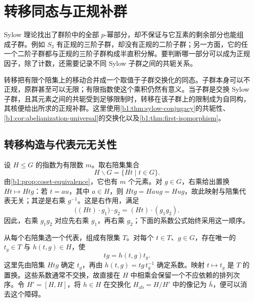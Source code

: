 
\section{转移同态与正规补群}
\label{b1:sec:C05}

Sylow 理论找出了群阶中的全部 \(p\)-幂部分，却不保证与它互素的剩余部分也能组成子群。例如 \(S_3\) 有正规的三阶子群，却没有正规的二阶子群；另一方面，它的任一个二阶子群都与正规的三阶子群构成半直积分解。要判断哪一部分可以成为正规因子，除了计数，还需要记录不同 Sylow 子群之间的共轭关系。

\ProseParagraphBreak
转移把有限个陪集上的移动合并成一个取值于子群交换化的同态。子群本身可以不正规，原群甚至可以无限；有限指数使这个乘积仍然有意义。当子群是交换 Sylow 子群，且其元素之间的共轭受到足够限制时，转移在该子群上的限制成为自同构，其核便给出所求的正规补群。这里使用\cref{b1:thm:sylow-conjugacy}的共轭性、\cref{b1:cor:abelianization-universal}的交换化以及\cref{b1:thm:first-isomorphism}。

\subsection{转移构造与代表元无关性}
\label{b1:subsec:C05:01}

设 \(H\leq G\) 的指数为有限数 \(m\)。取右陪集集合
\[
	H\backslash G=\{Ht\mid t\in G\}.
\]
由\cref{b1:prop:coset-equivalence}，它也有 \(m\) 个元素。对 \(g\in G\)，右乘给出置换 \(Ht\mapsto Htg\)：若 \(t=au\)，其中 \(a\in H\)，则 \(Htg=Haug=Hug\)，故此映射与陪集代表无关；其逆是右乘 \(g^{-1}\)。这是右作用，满足
\[
	\bigl((Ht)\cdot g_1\bigr)\cdot g_2=(Ht)\cdot(g_1g_2).
\]
因此，右乘 \(g_1g_2\) 对应先右乘 \(g_1\)，再右乘 \(g_2\)；下面的系数公式始终采用这一顺序。

\ProseParagraphBreak
从每个右陪集选一个代表，组成有限集 \(T\)。对每个 \(t\in T\)、\(g\in G\)，存在唯一的 \(t_g\in T\) 与 \(h(t,g)\in H\)，使
\begin{equation}\label{b1:eq:transfer-coset-factor}
	tg=h(t,g)t_g.
\end{equation}
这里先由陪集 \(Htg\) 确定 \(t_g\)，再由 \(h(t,g)=tg\,t_g^{-1}\) 确定系数。映射 \(t\mapsto t_g\) 是 \(T\) 的置换。这些系数通常不交换，故直接在 \(H\) 中相乘会保留一个不应依赖的排列次序。令 \(H'=[H,H]\)，将 \(h\in H\) 在交换化 \(H_{\mathrm{ab}}=H/H'\) 中的像记为 \(\bar h\)，便可以消去这个障碍。

